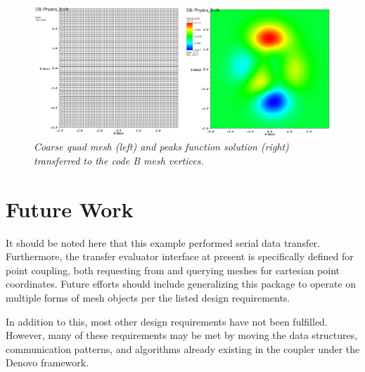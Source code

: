 \documentclass[letterpaper]{article}
\begin{document}
\begin{figure}[htpb!]
  \begin{center}
    \includegraphics[width=6in]{images/sol_B.png}
  \end{center}
  \caption{\small \sl Coarse quad mesh (left) and peaks
    function solution (right) transferred to the code B mesh
    vertices.}
  \label{fig:sol_B}
\end{figure}

\section{Future Work}
It should be noted here that this example performed serial data
transfer. Furthermore, the transfer evaluator interface at present is
specifically defined for point coupling, both requesting from and
querying meshes for cartesian point coordinates. Future efforts should
include generalizing this package to operate on multiple forms of mesh
objects per the listed design requirements.

In addition to this, most other design requirements have not been
fulfilled. However, many of these requirements may be met by moving
the data structures, communication patterns, and algorithms already
existing in the coupler under the Denovo framework.

\appendix
\end{document}
